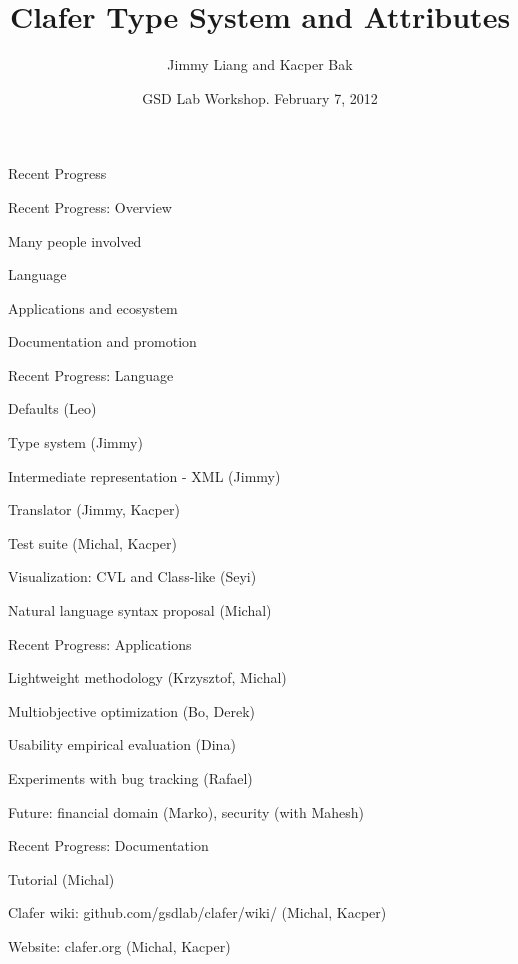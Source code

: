 \documentclass[table,15pt,t]{beamer}
\title{Clafer Type System and Attributes}
\author{Jimmy Liang and Kacper Bak}
\institute{\small Generative Software Development Lab\\University of Waterloo}
\date{GSD Lab Workshop. February 7, 2012}
\newcommand{\vmiddle}[1]{
  \vspace{\stretch{1}}
  #1
  \vspace{\stretch{1}}
}
\newcommand{\interframe}[1]{
\begin{frame}{}
\vmiddle{\hmiddle{\Huge #1}}
\end{frame}
}
\newcommand{\mlist}[1]{
\vmiddle{
  \begin{list}{}{}
    #1
  \end{list}
  }
}
\newcommand{\hmiddle}[1]{
  \begin{center}#1\end{center}
}
\begin{document}
\begin{frame}[plain]
  \vmiddle{\titlepage}
\end{frame}

\interframe{Recent Progress}

\begin{frame}{Recent Progress: Overview}
  \mlist{
  \item Many people involved
  \item Language
  \item Applications and ecosystem
  \item Documentation and promotion
  }
\end{frame}

\begin{frame}{Recent Progress: Language}
  \mlist{
  \item Defaults (Leo)
  \item Type system (Jimmy)
  \item Intermediate representation - XML (Jimmy)
  \item Translator (Jimmy, Kacper)
  \item Test suite (Michal, Kacper)
  \item Visualization: CVL and Class-like (Seyi)
  \item Natural language syntax proposal (Michal)
  }
\end{frame}

\begin{frame}{Recent Progress: Applications}
  \mlist{
  \item Lightweight methodology (Krzysztof, Michal)
  \item Multiobjective optimization (Bo, Derek)
  \item Usability empirical evaluation (Dina)
  \item Experiments with bug tracking (Rafael)
  \item Future: financial domain (Marko), security (with Mahesh)
  }
\end{frame}

\begin{frame}{Recent Progress: Documentation}
  \mlist{
  \item Tutorial (Michal)
  \item Clafer wiki: github.com/gsdlab/clafer/wiki/ (Michal, Kacper)
  \item Website: clafer.org (Michal, Kacper)
  }
\end{frame}
\end{document}
